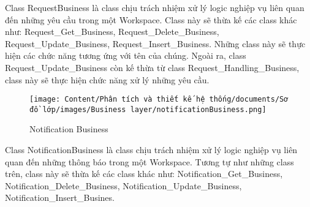 \par
Class RequestBusiness là class chịu trách nhiệm xử lý logic nghiệp vụ liên quan đến
những yêu cầu trong một Workspace. Class này sẽ thừa kế các class khác như:
Request\_Get\_Business, Request\_Delete\_Business, Request\_Update\_Business, Request\_Insert\_Business.
Những class này sẽ thực hiện các chức năng tương ứng với tên của chúng. Ngoài ra, class
Request\_Update\_Business còn kế thừa từ class Request\_Handling\_Business, class này sẽ thực
hiện chức năng xử lý những yêu cầu.
\begin{figure}[H]
    \centering
    \texttt{[image: Content/Phân tích và thiết kế hệ thống/documents/Sơ đồ lớp/images/Business layer/notificationBusiness.png]}
    \vspace{0.5cm}
    \caption{Notification Business}
    \label{fig:Notification Business}
\end{figure}
\par
Class NotificationBusiness là class chịu trách nhiệm xử lý logic nghiệp vụ liên quan đến
những thông báo trong một Workspace. Tương tự như những class trên, class này sẽ thừa kế các class khác như:
Notification\_Get\_Business, Notification\_Delete\_Business, Notification\_Update\_Business, Notification\_Insert\_Busines.
